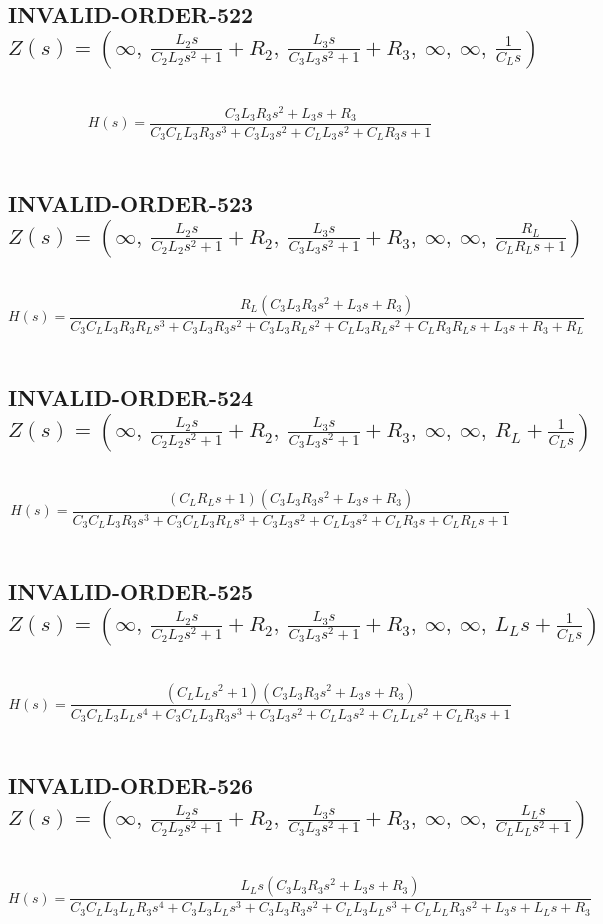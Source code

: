 \documentclass{article}
\begin{document}
\subsection{INVALID-ORDER-522 $Z(s) = \left( \infty, \  \frac{L_{2} s}{C_{2} L_{2} s^{2} + 1} + R_{2}, \  \frac{L_{3} s}{C_{3} L_{3} s^{2} + 1} + R_{3}, \  \infty, \  \infty, \  \frac{1}{C_{L} s}\right)$ } \ 
\textbf{\[H(s) = \frac{C_{3} L_{3} R_{3} s^{2} + L_{3} s + R_{3}}{C_{3} C_{L} L_{3} R_{3} s^{3} + C_{3} L_{3} s^{2} + C_{L} L_{3} s^{2} + C_{L} R_{3} s + 1}\] } \ 
\subsection{INVALID-ORDER-523 $Z(s) = \left( \infty, \  \frac{L_{2} s}{C_{2} L_{2} s^{2} + 1} + R_{2}, \  \frac{L_{3} s}{C_{3} L_{3} s^{2} + 1} + R_{3}, \  \infty, \  \infty, \  \frac{R_{L}}{C_{L} R_{L} s + 1}\right)$ } \ 
\textbf{\[H(s) = \frac{R_{L} \left(C_{3} L_{3} R_{3} s^{2} + L_{3} s + R_{3}\right)}{C_{3} C_{L} L_{3} R_{3} R_{L} s^{3} + C_{3} L_{3} R_{3} s^{2} + C_{3} L_{3} R_{L} s^{2} + C_{L} L_{3} R_{L} s^{2} + C_{L} R_{3} R_{L} s + L_{3} s + R_{3} + R_{L}}\] } \ 
\subsection{INVALID-ORDER-524 $Z(s) = \left( \infty, \  \frac{L_{2} s}{C_{2} L_{2} s^{2} + 1} + R_{2}, \  \frac{L_{3} s}{C_{3} L_{3} s^{2} + 1} + R_{3}, \  \infty, \  \infty, \  R_{L} + \frac{1}{C_{L} s}\right)$ } \ 
\textbf{\[H(s) = \frac{\left(C_{L} R_{L} s + 1\right) \left(C_{3} L_{3} R_{3} s^{2} + L_{3} s + R_{3}\right)}{C_{3} C_{L} L_{3} R_{3} s^{3} + C_{3} C_{L} L_{3} R_{L} s^{3} + C_{3} L_{3} s^{2} + C_{L} L_{3} s^{2} + C_{L} R_{3} s + C_{L} R_{L} s + 1}\] } \ 
\subsection{INVALID-ORDER-525 $Z(s) = \left( \infty, \  \frac{L_{2} s}{C_{2} L_{2} s^{2} + 1} + R_{2}, \  \frac{L_{3} s}{C_{3} L_{3} s^{2} + 1} + R_{3}, \  \infty, \  \infty, \  L_{L} s + \frac{1}{C_{L} s}\right)$ } \ 
\textbf{\[H(s) = \frac{\left(C_{L} L_{L} s^{2} + 1\right) \left(C_{3} L_{3} R_{3} s^{2} + L_{3} s + R_{3}\right)}{C_{3} C_{L} L_{3} L_{L} s^{4} + C_{3} C_{L} L_{3} R_{3} s^{3} + C_{3} L_{3} s^{2} + C_{L} L_{3} s^{2} + C_{L} L_{L} s^{2} + C_{L} R_{3} s + 1}\] } \ 
\subsection{INVALID-ORDER-526 $Z(s) = \left( \infty, \  \frac{L_{2} s}{C_{2} L_{2} s^{2} + 1} + R_{2}, \  \frac{L_{3} s}{C_{3} L_{3} s^{2} + 1} + R_{3}, \  \infty, \  \infty, \  \frac{L_{L} s}{C_{L} L_{L} s^{2} + 1}\right)$ } \ 
\textbf{\[H(s) = \frac{L_{L} s \left(C_{3} L_{3} R_{3} s^{2} + L_{3} s + R_{3}\right)}{C_{3} C_{L} L_{3} L_{L} R_{3} s^{4} + C_{3} L_{3} L_{L} s^{3} + C_{3} L_{3} R_{3} s^{2} + C_{L} L_{3} L_{L} s^{3} + C_{L} L_{L} R_{3} s^{2} + L_{3} s + L_{L} s + R_{3}}\] } \ 
\end{document}
